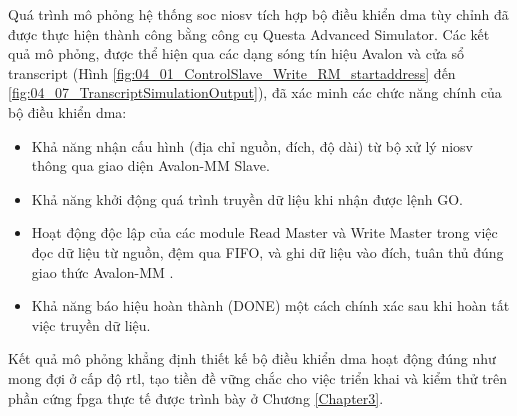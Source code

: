 Quá trình mô phỏng hệ thống \acrshort{soc} \acrshort{niosv} tích hợp bộ điều khiển \acrshort{dma} tùy chỉnh đã được thực hiện thành công bằng công cụ Questa Advanced Simulator. Các kết quả mô phỏng, được thể hiện qua các dạng sóng tín hiệu Avalon và cửa sổ transcript (Hình \ref{fig:04_01_ControlSlave_Write_RM_startaddress} đến \ref{fig:04_07_TranscriptSimulationOutput}), đã xác minh các chức năng chính của bộ điều khiển \acrshort{dma}:
\begin{itemize}
    \item Khả năng nhận cấu hình (địa chỉ nguồn, đích, độ dài) từ bộ xử lý \acrshort{niosv} thông qua giao diện Avalon-MM Slave.
    \item Khả năng khởi động quá trình truyền dữ liệu khi nhận được lệnh GO.
    \item Hoạt động độc lập của các module Read Master và Write Master trong việc đọc dữ liệu từ nguồn, đệm qua FIFO, và ghi dữ liệu vào đích, tuân thủ đúng giao thức Avalon-MM \cite{avalon_mm_transfer}.
    \item Khả năng báo hiệu hoàn thành (DONE) một cách chính xác sau khi hoàn tất việc truyền dữ liệu.
\end{itemize}
Kết quả mô phỏng khẳng định thiết kế bộ điều khiển \acrshort{dma} hoạt động đúng như mong đợi ở cấp độ \acrfull{rtl}, tạo tiền đề vững chắc cho việc triển khai và kiểm thử trên phần cứng \acrshort{fpga} thực tế được trình bày ở Chương \ref{Chapter3}.

\FloatBarrier %